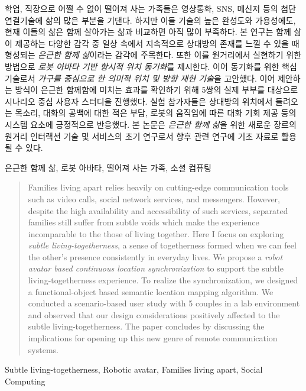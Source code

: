
\begin{summary}      
학업, 직장으로 어쩔 수 없이 떨어져 사는 가족들은 영상통화, SNS, 메신저 등의 첨단 연결기술에 삶의 많은 부분을 기댄다. 하지만 이들 기술의 높은 완성도와 가용성에도, 현재 이들의 삶은 함께 살아가는 삶과 비교하면 아직 많이 부족하다. 본 연구는 함께 삶이 제공하는 다양한 감각 중 일상 속에서 지속적으로 상대방의 존재를 느낄 수 있을 때 형성되는 \emph{은근한 함께 삶}이라는 감각에 주목한다. 또한 이를 원거리에서 실현하기 위한 방법으로 \emph{로봇 아바타 기반 항시적 위치 동기화}를 제시한다. 이어 동기화를 위한 핵심 기술로서 \emph{가구를 중심으로 한 의미적 위치 및 방향 재현 기술}을 고안했다. 이어 제안하는 방식이 은근한 함께함에 미치는 효과를 확인하기 위해 5쌍의 실제 부부를 대상으로 시나리오 중심 사용자 스터디을 진행했다. 실험 참가자들은 상대방의 위치에서 들려오는 목소리, 대화의 공백에 대한 적은 부담, 로봇의 움직임에 따른 대화 기회 제공 등의 시스템 요소에 긍정적으로 반응했다. 본 논문은 \emph{은근한 함께 삶}을 위한 새로운 장르의 원거리 인터랙션 기술 및 서비스의 초기 연구로서 향후 관련 연구에 기초 자료로 활용될 수 있다.
\end{summary}

\begin{Korkeyword}
은근한 함께 삶, 로봇 아바타, 떨어져 사는 가족, 소셜 컴퓨팅
\end{Korkeyword}


\begin{abstract}
Families living apart relies heavily on cutting-edge communication tools such as video calls, social network services, and messengers. However, despite the high availability and accessibility of such services, separated families still suffer from subtle voids which make the experience incomparable to the those of living together. Here I focus on exploring \emph{subtle living-togetherness}, a sense of togetherness formed when we can feel the other's presence consistently in everyday lives. We propose a \emph{robot avatar based continuous location synchronization} to support the subtle living-togetherness experience. To realize the synchronization, we designed a functional-object based semantic location mapping algorithm. We conducted a scenario-based user study with 5 couples in a lab environment and observed that our design considerations positively affected to the subtle living-togetherness. The paper concludes by discussing the implications for opening up this new genre of remote communication systems.
\end{abstract}
 
\begin{Engkeyword}
Subtle living-togetherness, Robotic avatar, Families living apart, Social Computing
\end{Engkeyword}
